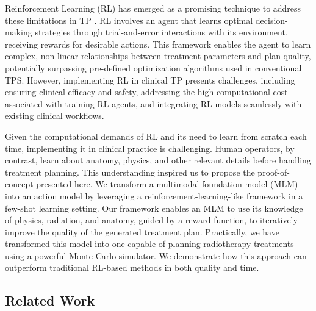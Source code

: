 \documentclass[runningheads]{llncs}
\begin{document}
Reinforcement Learning (RL) \cite{Sutton2018} has emerged as a promising technique to address these limitations in TP \cite{rl_beam_radiotherapy, rl_radiotherapy_3, rl_radiotherapy_4,  rl_radiotherapy_5}. RL involves an agent that learns optimal decision-making strategies through trial-and-error interactions with its environment, receiving rewards for desirable actions. This framework enables the agent to learn complex, non-linear relationships between treatment parameters and plan quality, potentially surpassing pre-defined optimization algorithms used in conventional TPS. However, implementing RL in clinical TP presents challenges, including ensuring clinical efficacy and safety, addressing the high computational cost associated with training RL agents, and integrating RL models seamlessly with existing clinical workflows.

Given the computational demands of RL and its need to learn from scratch each time, implementing it in clinical practice is challenging. Human operators, by contrast, learn about anatomy, physics, and other relevant details before handling treatment planning. This understanding inspired us to propose the proof-of-concept presented here. We transform a multimodal foundation model (MLM) into an action model by leveraging a reinforcement-learning-like framework in a few-shot learning setting. Our framework enables an MLM to use its knowledge of physics, radiation, and anatomy, guided by a reward function, to iteratively improve the quality of the generated treatment plan. Practically, we have transformed this model into one capable of planning radiotherapy treatments using a powerful Monte Carlo simulator. We demonstrate how this approach can outperform traditional RL-based methods in both quality and time.

\vspace{-1mm}

\subsection{Related Work}
\end{document}
